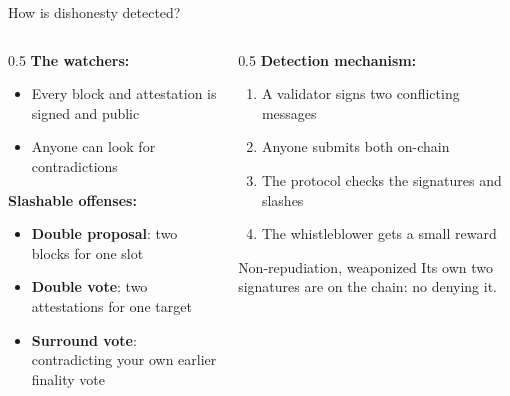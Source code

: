 \ifdefined\PRESENTATION\else\PassOptionsToClass{handout}{beamer}\fi\documentclass[aspectratio=169, lualatex]{beamer}
\begin{document}
\begin{frame}{How is dishonesty detected?}
	\begin{columns}[c]
		\begin{column}{0.5\textwidth}
			\textbf{The watchers:}
			\begin{itemize}
				\item Every block and attestation is signed and public
				\item Anyone can look for contradictions
			\end{itemize}
			\textbf{Slashable offenses:}
			\begin{itemize}
				\item \textbf{Double proposal}: two blocks for one slot
				\item \textbf{Double vote}: two attestations for one target
				\item \textbf{Surround vote}: contradicting your own earlier finality vote
			\end{itemize}
		\end{column}
		\begin{column}{0.5\textwidth}
			\textbf{Detection mechanism:}
			\begin{enumerate}
				\item A validator signs two conflicting messages
				\item Anyone submits both on-chain
				\item The protocol checks the signatures and slashes
				\item The whistleblower gets a small reward
			\end{enumerate}
			\begin{exampleblock}{Non-repudiation, weaponized}
				Its own two signatures are on the chain: no denying it.
			\end{exampleblock}
		\end{column}
	\end{columns}
\end{frame}
\end{document}
